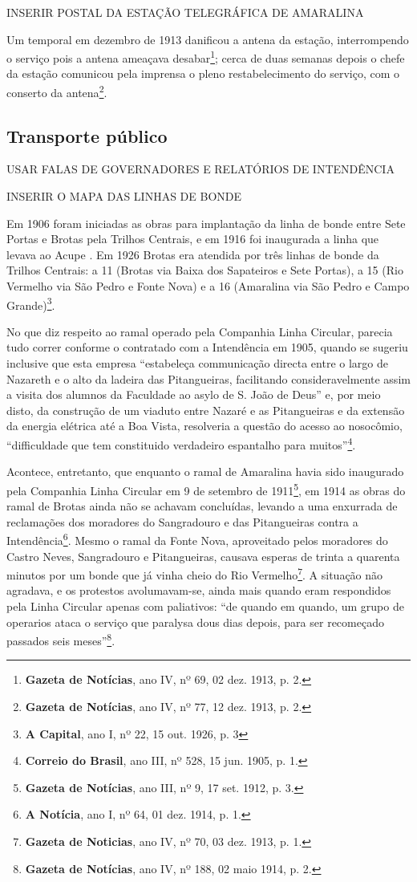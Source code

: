 INSERIR POSTAL DA ESTAÇÃO TELEGRÁFICA DE AMARALINA

Um temporal em dezembro de 1913 danificou a antena da estação, interrompendo o serviço pois a antena ameaçava desabar\footnote{\textbf{Gazeta de Notícias}, ano IV, nº 69, 02 dez. 1913, p. 2.}; cerca de duas semanas depois o chefe da estação comunicou pela imprensa o pleno restabelecimento do serviço, com o conserto da antena\footnote{\textbf{Gazeta de Notícias}, ano IV, nº 77, 12 dez. 1913, p. 2.}.

\subsection{Transporte público}

USAR FALAS DE GOVERNADORES E RELATÓRIOS DE INTENDÊNCIA

INSERIR O MAPA DAS LINHAS DE BONDE


Em 1906 foram iniciadas as obras para implantação da linha de bonde entre Sete Portas e Brotas pela Trilhos Centrais, e em 1916 foi inaugurada a linha que levava ao Acupe \cite[p.~299]{VASCONCELOS2002}. Em 1926 Brotas era atendida por três linhas de bonde da Trilhos Centrais: a 11 (Brotas via Baixa dos Sapateiros e Sete Portas), a 15 (Rio Vermelho via São Pedro e Fonte Nova) e a 16 (Amaralina via São Pedro e Campo Grande)\footnote{\textbf{A Capital}, ano I, nº 22, 15 out. 1926, p. 3}.

No que diz respeito ao ramal operado pela Companhia Linha Circular, parecia tudo correr conforme o contratado com a Intendência em 1905, quando se sugeriu inclusive que esta empresa ``estabeleça communicação directa entre o largo de Nazareth e o alto da ladeira das Pitangueiras, facilitando consideravelmente assim a visita dos alumnos da Faculdade ao asylo de S. João de Deus'' e, por meio disto, da construção de um viaduto entre Nazaré e as Pitangueiras e da extensão da energia elétrica até a Boa Vista, resolveria a questão do acesso ao nosocômio, ``difficuldade que tem constituido verdadeiro espantalho para muitos''\footnote{\textbf{Correio do Brasil}, ano III, nº 528, 15 jun. 1905, p. 1.}. 

Acontece, entretanto, que enquanto o ramal de Amaralina havia sido inaugurado pela Companhia Linha Circular em 9 de setembro de 1911\footnote{\textbf{Gazeta de Notícias}, ano III, nº 9, 17 set. 1912, p. 3.}, em 1914 as obras do ramal de Brotas ainda não se achavam concluídas, levando a uma enxurrada de reclamações dos moradores do Sangradouro e das Pitangueiras contra a Intendência\footnote{\textbf{A Notícia}, ano I, nº 64, 01 dez. 1914, p. 1.}. Mesmo o ramal da Fonte Nova, aproveitado pelos moradores do Castro Neves, Sangradouro e Pitangueiras, causava esperas de trinta a quarenta minutos por um bonde que já vinha cheio do Rio Vermelho\footnote{\textbf{Gazeta de Noticias}, ano IV, nº 70, 03 dez. 1913, p. 1.}. A situação não agradava, e os protestos avolumavam-se, ainda mais quando eram respondidos pela Linha Circular apenas com paliativos: ``de quando em quando, um grupo de operarios ataca o serviço que paralysa dous dias depois, para ser recomeçado passados seis meses''\footnote{\textbf{Gazeta de Notícias}, ano IV, nº 188, 02 maio 1914, p. 2.}. 

